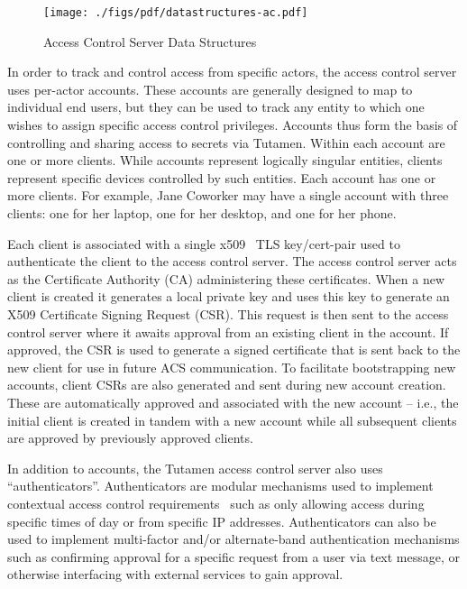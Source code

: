 \begin{figure}[th]
  \centering
  \texttt{[image: ./figs/pdf/datastructures-ac.pdf]}
  \caption{Access Control Server Data Structures}
  \label{fig:tutamen:acstructs}
\end{figure}

In order to track and control access from specific actors, the access
control server uses per-actor accounts. These accounts are generally
designed to map to individual end users, but they can be used to track
any entity to which one wishes to assign specific access control
privileges. Accounts thus form the basis of controlling and sharing
access to secrets via Tutamen. Within each account are one or more
clients. While accounts represent logically singular entities, clients
represent specific devices controlled by such entities. Each account
has one or more clients. For example, Jane Coworker may have a single
account with three clients: one for her laptop, one for her desktop,
and one for her phone.

Each client is associated with a single x509~\cite{rfc5280} TLS
key/cert-pair used to authenticate the client to the access control
server. The access control server acts as the Certificate Authority
(CA) administering these certificates. When a new client is created it
generates a local private key and uses this key to generate an X509
Certificate Signing Request (CSR). This request is then sent to the
access control server where it awaits approval from an existing client
in the account. If approved, the CSR is used to generate a signed
certificate that is sent back to the new client for use in future ACS
communication. To facilitate bootstrapping new accounts, client CSRs
are also generated and sent during new account creation. These are
automatically approved and associated with the new account -- i.e.,
the initial client is created in tandem with a new account while all
subsequent clients are approved by previously approved clients.

In addition to accounts, the Tutamen access control server also uses
``authenticators''. Authenticators are modular mechanisms used to
implement contextual access control requirements~\cite{hulsebosch2005}
such as only allowing access during specific times of day or from
specific IP addresses. Authenticators can also be used to implement
multi-factor and/or alternate-band authentication mechanisms such as
confirming approval for a specific request from a user via text
message, or otherwise interfacing with external services to gain
approval.

